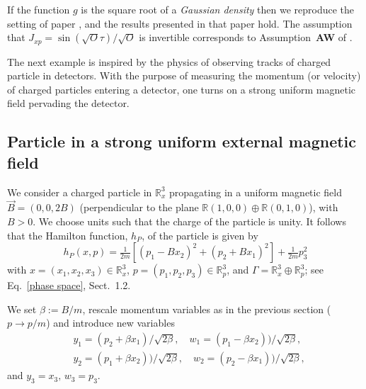 \documentclass[12pt]{article}
\begin{document}
If the function $g$ is the square root of a \textit{Gaussian density} then we reproduce the setting of paper \cite{BBFF}, 
and the results presented in that paper hold. The assumption that $J_{xp}=\operatorname{sin}(\sqrt{O}\tau)/\sqrt{O}$ 
is invertible corresponds to Assumption~{\bf AW} of \cite{BBFF}.

The next example is inspired by the physics of observing tracks of charged particle in detectors. 
With the purpose of measuring the momentum (or velocity) of charged particles entering a detector, 
one turns on a strong uniform magnetic field pervading the detector.

\subsection{Particle in a strong uniform external magnetic field}
We consider a charged particle in $\mathbb R_x^3$ propagating in a uniform magnetic field $\vec{B}=(0,0,2B)$ 
(perpendicular to the plane $\mathbb R (1,0,0)\oplus \mathbb R (0,1,0)$), with $B>0$. 
We choose units such that the charge of the particle is unity. It follows that the Hamilton function, $h_P$, of
the particle is given by
$$h_P(x,p)=\tfrac1{2m}[(p_1 - B x_2)^2+(p_2 + B x_1)^2]+\tfrac1{2m} p_3^2$$
with $x=(x_1,x_2,x_3)\in \mathbb{R}^{3}_x$, $p=(p_1,p_2,p_3)\in \mathbb{R}^{3}_p$, and
$\Gamma= \mathbb{R}^{3}_{x} \oplus \mathbb{R}^{3}_{p}$; see Eq.~\eqref{phase space}, Sect.~1.2.

We set $\beta:=B/m$, rescale momentum variables as in the previous section ($p\to p/m$) and introduce new variables 
\begin{align}\label{new var}
&y_1=(p_2+\beta x_1)/\sqrt{2\beta}, \quad w_1=(p_1-\beta x_2))/\sqrt{2\beta}, \nonumber\\
& y_2=(p_1+\beta x_2))/\sqrt{2\beta}, \quad w_2=(p_2-\beta x_1))/\sqrt{2\beta}, 
\end{align}
and $ y_3=x_3,\, w_3=p_3$.
\end{document}
